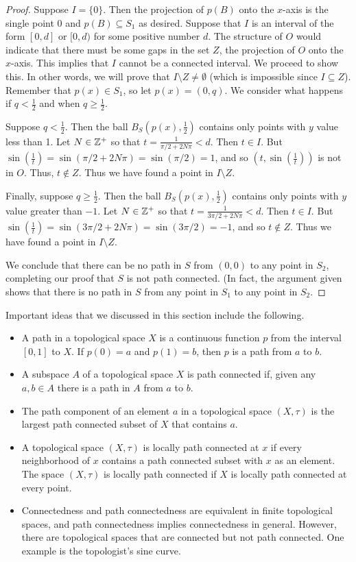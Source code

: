 \begin{proof}
Suppose $I = \{0\}$. Then the projection of $p(B)$ onto the $x$-axis is the single point $0$ and $p(B) \subseteq S_1$ as desired. Suppose that $I$ is an interval of the form $[0,d]$ or $[0,d)$ for some positive number $d$. The structure of $O$ would indicate that there must be some gaps in the set $Z$, the projection of $O$ onto the $x$-axis. This implies that $I$ cannot be a connected interval. We proceed to show this. In other words, we will prove that $I \setminus Z \neq \emptyset$ (which is impossible since $I \subseteq Z$). Remember that $p(x) \in S_1$, so let $p(x) = (0, q)$. We consider what happens if $q < \frac{1}{2}$ and when $q \geq \frac{1}{2}$.  

Suppose $q < \frac{1}{2}$. Then the ball $B_S\left(p(x), \frac{1}{2}\right)$ contains only points with $y$ value less than 1. Let $N \in \mathbb{Z}^+$ so that $t=\frac{1}{\pi/2+2N\pi} < d$. Then $t \in I$. But $\sin\left(\frac{1}{t}\right) = \sin(\pi/2 + 2N\pi) = \sin(\pi/2) = 1$, and so $\left(t,\sin\left(\frac{1}{t}\right)\right)$ is not in $O$. Thus, $t \notin Z$. Thus we have found a point in $I \setminus Z$. 

Finally, suppose $q \geq \frac{1}{2}$. Then the ball $B_S\left(p(x), \frac{1}{2}\right)$ contains only points with $y$ value greater than $-1$. Let $N \in \mathbb{Z}^+$ so that $t=\frac{1}{3\pi/2+2N\pi} < d$. Then $t \in I$. But $\sin\left(\frac{1}{t}\right) = \sin(3\pi/2 + 2N\pi) = \sin(3\pi/2) = -1$, and so $t \notin Z$. Thus we have found a point in $I \setminus Z$. 

We conclude that there can be no path in $S$ from $(0,0)$ to any point in $S_2$, completing our proof that $S$ is not path connected. (In fact, the  argument given shows that there is no path in $S$ from any point in $S_1$ to any point in $S_2$. 
\end{proof}

Important ideas that we discussed in this section include the following.
\begin{itemize}
\item A path in a topological space $X$ is a continuous function $p$ from the interval $[0,1]$ to $X$. If $p(0) = a$ and $p(1) = b$, then $p$ is a path from $a$ to $b$. 
\item A subspace $A$ of a topological space $X$ is path connected if, given any $a, b \in A$ there is a path in $A$ from $a$ to $b$.
\item The path component of an element $a$ in a topological space $(X, \tau)$ is the largest path connected subset of $X$ that contains $a$. 
\item A topological space $(X, \tau)$ is locally path connected at $x$ if every neighborhood of $x$ contains a path connected subset with $x$ as an element. The space $(X, \tau)$ is locally path connected if $X$ is locally path connected at every point.
\item Connectedness and path connectedness are equivalent in finite topological spaces, and path connectedness implies connectedness in general. However, there are topological spaces that are connected but not path connected. One example is the topologist's sine curve. 
\end{itemize}


